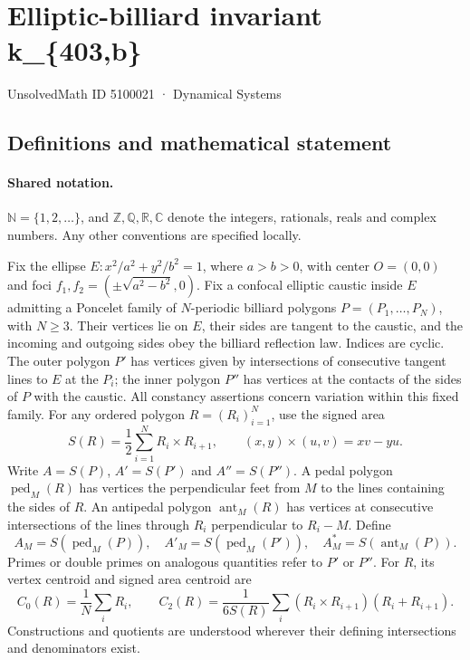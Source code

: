 \documentclass[11pt]{article}
\begin{document}
\setcounter{section}{5100020}
\section{Elliptic-billiard invariant k\_\{403,b\}}\label{5100021}
{\small\sffamily UnsolvedMath ID 5100021 · Dynamical Systems}
\subsection{Definitions and mathematical statement}

\paragraph{Shared notation.}$\mathbb N=\{1,2,\ldots\}$, and $\mathbb Z,\mathbb Q,\mathbb R,\mathbb C$ denote the integers, rationals, reals and complex numbers. Any other conventions are specified locally.


Fix the ellipse $E:x^2/a^2+y^2/b^2=1$, where $a>b>0$, with center $O=(0,0)$ and foci $f_1,f_2=(\pm\sqrt{a^2-b^2},0)$. Fix a confocal elliptic caustic inside $E$ admitting a Poncelet family of $N$-periodic billiard polygons $P=(P_1,\ldots,P_N)$, with $N\geq3$. Their vertices lie on $E$, their sides are tangent to the caustic, and the incoming and outgoing sides obey the billiard reflection law. Indices are cyclic. The outer polygon $P'$ has vertices given by intersections of consecutive tangent lines to $E$ at the $P_i$; the inner polygon $P''$ has vertices at the contacts of the sides of $P$ with the caustic. All constancy assertions concern variation within this fixed family.
For any ordered polygon $R=(R_i)_{i=1}^N$, use the signed area
\[S(R)=\frac12\sum_{i=1}^N R_i\times R_{i+1},\qquad (x,y)\times(u,v)=xv-yu.\]
Write $A=S(P)$, $A'=S(P')$ and $A''=S(P'')$. A pedal polygon $\operatorname{ped}_M(R)$ has vertices the perpendicular feet from $M$ to the lines containing the sides of $R$. An antipedal polygon $\operatorname{ant}_M(R)$ has vertices at consecutive intersections of the lines through $R_i$ perpendicular to $R_i-M$. Define
\[A_M=S(\operatorname{ped}_M(P)),\quad A'_M=S(\operatorname{ped}_M(P')),\quad A_M^*=S(\operatorname{ant}_M(P)).\]
Primes or double primes on analogous quantities refer to $P'$ or $P''$. For $R$, its vertex centroid and signed area centroid are
\[C_0(R)=\frac1N\sum_i R_i,\qquad C_2(R)=\frac{1}{6S(R)}\sum_i(R_i\times R_{i+1})(R_i+R_{i+1}).\]
Constructions and quotients are understood wherever their defining intersections and denominators exist.
\end{document}
